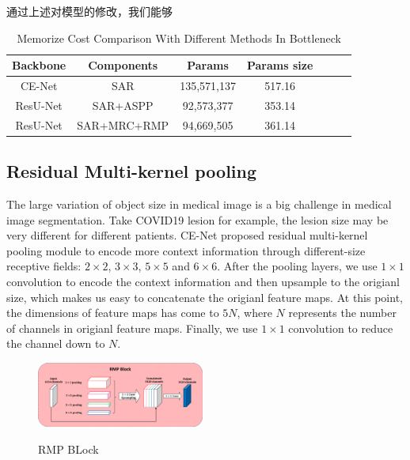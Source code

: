\documentclass{ieeeaccess}
\begin{document}
  通过上述对模型的修改，我们能够
  \begin{table}[htbp]
    \vspace{-2mm}
    \begin{center}\small
    \label{param-table}
    \begin{tabular}{ccccccc}
      
    \toprule
    Backbone & Components & Params & Params size \\
    \midrule
      CE-Net & SAR & 135,571,137 & 517.16 \\
      ResU-Net & SAR+ASPP    & 92,573,377 & 353.14  \\
      ResU-Net & SAR+MRC+RMP & 94,669,505 & 361.14  \\
  \bottomrule    
    \end{tabular}
    \caption{Memorize Cost Comparison With Different Methods In Bottleneck}
  \end{center}
    \vspace{-4mm}
  \end{table}
  
  \subsection{Residual Multi-kernel pooling}
  The large variation of object size in medical image is a big challenge in medical image segmentation. Take COVID19 lesion for example, the lesion size may be very different for different patients.
  CE-Net proposed residual multi-kernel pooling module to encode more context information through different-size receptive fields: \(2\times 2\), \(3\times 3\), \(5\times 5\) and \(6 \times 6\). 
  After the pooling layers, we use \(1\times 1\) convolution to encode the context information and then upsample to the origianl size, which makes us easy to concatenate the origianl feature maps. 
  At this point, the dimensions of feature maps has come to \(5N\), where \(N\) represents the number of channels in origianl feature maps.
  Finally, we use \(1\times 1\) convolution to reduce the channel down to \(N\).
  \begin{figure}[htbp]
    \small
    \centering
    \includegraphics[width=0.49\textwidth]{figure/rmp_block.pdf}
    \label{fig:rmp_block}
    \caption{RMP BLock}
  \end{figure}
\end{document}

